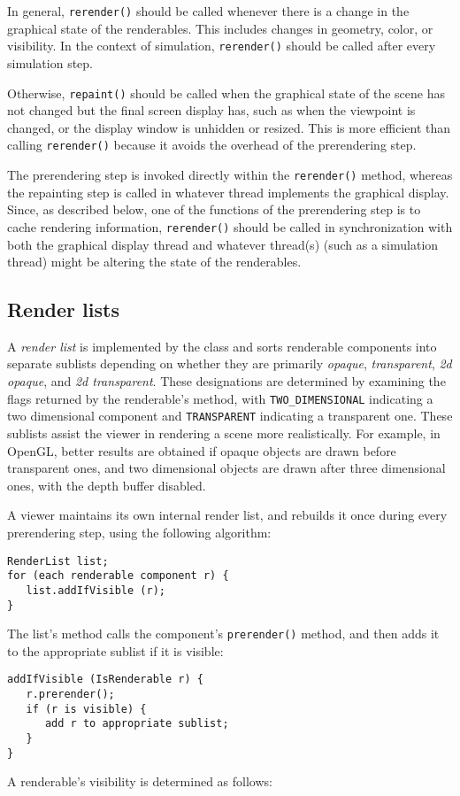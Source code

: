 In general, {\tt rerender()} should be called whenever there is a
change in the graphical state of the renderables. This includes
changes in geometry, color, or visibility.  In the context of
simulation, {\tt rerender()} should be called after every simulation
step.

Otherwise, {\tt repaint()} should be called when the graphical state
of the scene has not changed but the final screen display has, such as
when the viewpoint is changed, or the display window is unhidden or
resized. This is more efficient than calling {\tt rerender()} because
it avoids the overhead of the prerendering step.

The prerendering step is invoked directly within the {\tt rerender()}
method, whereas the repainting step is called in whatever thread
implements the graphical display. Since, as described below, one of
the functions of the prerendering step is to cache rendering
information, {\tt rerender()} should be called in synchronization with both the
graphical display thread and whatever thread(s) (such as a simulation
thread) might be altering the state of the renderables.

\subsection{Render lists}
\label{RenderLists:sec}

A {\it render list} is implemented by the class
 and sorts renderable components
into separate sublists depending on whether they are primarily {\it
opaque}, {\it transparent}, {\it 2d opaque}, and {\it 2d transparent}.
These designations are determined by examining the flags returned by
the renderable's
 method,
with {\tt TWO\_DIMENSIONAL} indicating a two dimensional component and
{\tt TRANSPARENT} indicating a transparent one. These sublists assist
the viewer in rendering a scene more realistically.  For example, in
OpenGL, better results are obtained if opaque objects are drawn before
transparent ones, and two dimensional objects are drawn after three
dimensional ones, with the depth buffer disabled.

A viewer maintains its own internal render list, and rebuilds it once
during every prerendering step, using the following algorithm:
%
\begin{lstlisting}[]
RenderList list;
for (each renderable component r) {
   list.addIfVisible (r);
}
\end{lstlisting}
%
The list's 
method calls the component's {\tt prerender()} method, and then adds
it to the appropriate sublist if it is visible:
%
\begin{lstlisting}
addIfVisible (IsRenderable r) {
   r.prerender();
   if (r is visible) {
      add r to appropriate sublist;
   }
}
\end{lstlisting}
%
A renderable's visibility is determined as follows:

